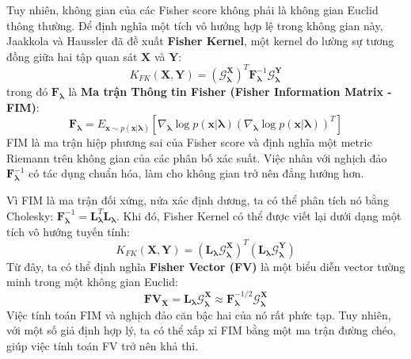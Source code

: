 Tuy nhiên, không gian của các Fisher score không phải là không gian Euclid thông thường. Để định nghĩa một tích vô hướng hợp lệ trong không gian này, Jaakkola và Haussler đã đề xuất \textbf{Fisher Kernel}, một kernel đo lường sự tương đồng giữa hai tập quan sát $\mathbf{X}$ và $\mathbf{Y}$:
\begin{equation}
    K_{FK}(\mathbf{X}, \mathbf{Y}) = (\mathcal{G}_{\boldsymbol{\lambda}}^{\mathbf{X}})^T \mathbf{F}_{\boldsymbol{\lambda}}^{-1} \mathcal{G}_{\boldsymbol{\lambda}}^{\mathbf{Y}}
    \label{eq:fisher_kernel}
\end{equation}
trong đó $\mathbf{F}_{\boldsymbol{\lambda}}$ là \textbf{Ma trận Thông tin Fisher (Fisher Information Matrix - FIM)}:
\begin{equation}
    \mathbf{F}_{\boldsymbol{\lambda}} = E_{\mathbf{x} \sim p(\mathbf{x}|\boldsymbol{\lambda})} \left[ \nabla_{\boldsymbol{\lambda}} \log p(\mathbf{x}|\boldsymbol{\lambda}) (\nabla_{\boldsymbol{\lambda}} \log p(\mathbf{x}|\boldsymbol{\lambda}))^T \right]
\end{equation}
FIM là ma trận hiệp phương sai của Fisher score và định nghĩa một metric Riemann trên không gian của các phân bố xác suất. Việc nhân với nghịch đảo $\mathbf{F}_{\boldsymbol{\lambda}}^{-1}$ có tác dụng chuẩn hóa, làm cho không gian trở nên đẳng hướng hơn.

Vì FIM là ma trận đối xứng, nửa xác định dương, ta có thể phân tích nó bằng Cholesky: $\mathbf{F}_{\boldsymbol{\lambda}}^{-1} = \mathbf{L}_{\boldsymbol{\lambda}}^T \mathbf{L}_{\boldsymbol{\lambda}}$. Khi đó, Fisher Kernel có thể được viết lại dưới dạng một tích vô hướng tuyến tính:
\begin{equation}
    K_{FK}(\mathbf{X}, \mathbf{Y}) = (\mathbf{L}_{\boldsymbol{\lambda}} \mathcal{G}_{\boldsymbol{\lambda}}^{\mathbf{X}})^T (\mathbf{L}_{\boldsymbol{\lambda}} \mathcal{G}_{\boldsymbol{\lambda}}^{\mathbf{Y}})
\end{equation}
Từ đây, ta có thể định nghĩa \textbf{Fisher Vector (FV)} là một biểu diễn vector tường minh trong một không gian Euclid:
\begin{equation}
    \mathbf{FV}_{\mathbf{X}} = \mathbf{L}_{\boldsymbol{\lambda}} \mathcal{G}_{\boldsymbol{\lambda}}^{\mathbf{X}} \approx \mathbf{F}_{\boldsymbol{\lambda}}^{-1/2} \mathcal{G}_{\boldsymbol{\lambda}}^{\mathbf{X}}
    \label{eq:fv_definition_full}
\end{equation}
Việc tính toán FIM và nghịch đảo căn bậc hai của nó rất phức tạp. Tuy nhiên, với một số giả định hợp lý, ta có thể xấp xỉ FIM bằng một ma trận đường chéo, giúp việc tính toán FV trở nên khả thi.

